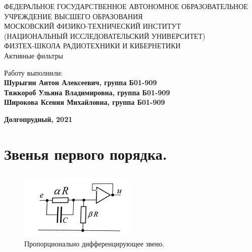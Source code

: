 \documentclass[15pt,a5paper,reqno]{article}
\begin{document}
\begin{center}
  {\small ФЕДЕРАЛЬНОЕ ГОСУДАРСТВЕННОЕ АВТОНОМНОЕ ОБРАЗОВАТЕЛЬНОЕ\\ УЧРЕЖДЕНИЕ ВЫСШЕГО ОБРАЗОВАНИЯ\\ МОСКОВСКИЙ ФИЗИКО-ТЕХНИЧЕСКИЙ ИНСТИТУТ\\ (НАЦИОНАЛЬНЫЙ ИССЛЕДОВАТЕЛЬСКИЙ УНИВЕРСИТЕТ)\\ ФИЗТЕХ-ШКОЛА РАДИОТЕХНИКИ И КИБЕРНЕТИКИ}\\
  \hfill \break
  \hfill \break
  \hfill \break
  \Huge{Активные фильтры}\\
\end{center}

\hfill \break
\hfill \break
\hfill \break
\hfill \break
\hfill \break
\hfill \break

\begin{flushright}
  \normalsize{Работу выполнили:}\\
  \normalsize{\textbf{Шурыгин Антон Алексеевич, группа Б01-909 \\
                      Тяжкороб Ульяна Владимировна, группа Б01-909   \\   
                      Широкова Ксения Михайловна, группа Б01-909}}\\
\end{flushright}

\begin{center}
  \normalsize{\textbf{Долгопрудный, 2021}}
\end{center}


\thispagestyle{empty} %


\newpage
\thispagestyle{plain}
\tableofcontents
\thispagestyle{plain}
\newpage



\section{Звенья первого порядка.}

\subsection{}

\begin{figure}[h!]
  \centering
  \includegraphics[width=0.4\linewidth]{pics/pic1.png}
  \caption{Пропорционально дифференцирующее звено.}
  \label{}
\end{figure}
\end{document}
